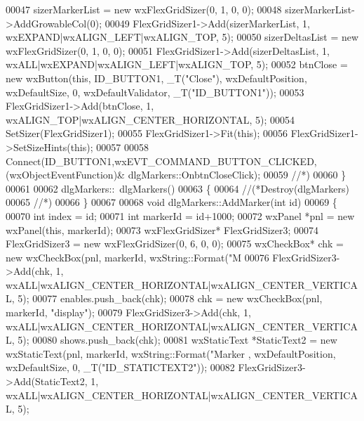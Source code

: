 \begin{DoxyCode}
00047     sizerMarkerList = \textcolor{keyword}{new} wxFlexGridSizer(0, 1, 0, 0);
00048     sizerMarkerList->AddGrowableCol(0);
00049     FlexGridSizer1->Add(sizerMarkerList, 1, wxEXPAND|wxALIGN\_LEFT|wxALIGN\_TOP, 5);
00050     sizerDeltasList = \textcolor{keyword}{new} wxFlexGridSizer(0, 1, 0, 0);
00051     FlexGridSizer1->Add(sizerDeltasList, 1, wxALL|wxEXPAND|wxALIGN\_LEFT|wxALIGN\_TOP, 5);
00052     btnClose = \textcolor{keyword}{new} wxButton(\textcolor{keyword}{this}, ID_BUTTON1, _T(\textcolor{stringliteral}{"Close"}), wxDefaultPosition, wxDefaultSize, 0, 
      wxDefaultValidator, _T(\textcolor{stringliteral}{"ID\_BUTTON1"}));
00053     FlexGridSizer1->Add(btnClose, 1, wxALIGN\_TOP|wxALIGN\_CENTER\_HORIZONTAL, 5);
00054     SetSizer(FlexGridSizer1);
00055     FlexGridSizer1->Fit(\textcolor{keyword}{this});
00056     FlexGridSizer1->SetSizeHints(\textcolor{keyword}{this});
00057 
00058     Connect(ID_BUTTON1,wxEVT\_COMMAND\_BUTTON\_CLICKED,(wxObjectEventFunction)&
      dlgMarkers::OnbtnCloseClick);
00059     \textcolor{comment}{//*)}
00060 \}
00061 
00062 dlgMarkers::~dlgMarkers()
00063 \{
00064     \textcolor{comment}{//(*Destroy(dlgMarkers)}
00065     \textcolor{comment}{//*)}
00066 \}
00067 
00068 \textcolor{keywordtype}{void} dlgMarkers::AddMarker(\textcolor{keywordtype}{int} \textcolor{keywordtype}{id})
00069 \{
00070     \textcolor{keywordtype}{int} index = id;
00071     \textcolor{keywordtype}{int} markerId = \textcolor{keywordtype}{id}+1000;
00072     wxPanel *pnl = \textcolor{keyword}{new} wxPanel(\textcolor{keyword}{this}, markerId);
00073     wxFlexGridSizer* FlexGridSizer3;
00074     FlexGridSizer3 = \textcolor{keyword}{new} wxFlexGridSizer(0, 6, 0, 0);
00075     wxCheckBox* chk = \textcolor{keyword}{new} wxCheckBox(pnl, markerId, wxString::Format(\textcolor{stringliteral}{"M%
00076     FlexGridSizer3->Add(chk, 1, wxALL|wxALIGN\_CENTER\_HORIZONTAL|wxALIGN\_CENTER\_VERTICAL, 5);
00077     enables.push\_back(chk);
00078     chk = \textcolor{keyword}{new} wxCheckBox(pnl, markerId, \textcolor{stringliteral}{"display"});
00079     FlexGridSizer3->Add(chk, 1, wxALL|wxALIGN\_CENTER\_HORIZONTAL|wxALIGN\_CENTER\_VERTICAL, 5);
00080     shows.push\_back(chk);
00081     wxStaticText *StaticText2 = \textcolor{keyword}{new} wxStaticText(pnl, markerId, wxString::Format(\textcolor{stringliteral}{"Marker%
      , wxDefaultPosition, wxDefaultSize, 0, _T(\textcolor{stringliteral}{"ID\_STATICTEXT2"}));
00082     FlexGridSizer3->Add(StaticText2, 1, wxALL|wxALIGN\_CENTER\_HORIZONTAL|wxALIGN\_CENTER\_VERTICAL, 5);
}}
\end{DoxyCode}
